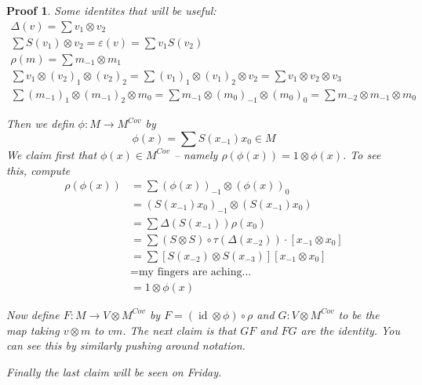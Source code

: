 \documentclass[12pt]{article}
\theoremstyle{break}
\theoremstyle{nonumberbreak}
\theoremstyle{changebreak}
\theoremstyle{break}
\theoremstyle{nonumberbreak}
\newtheorem{prf}{Proof}
\theoremstyle{nonumberplain}
\theoremstyle{change}
\DeclareMathOperator{\id}{id}
\begin{document}
\begin{prf}
	Some identites that will be useful:
	\begin{align*}
		\Delta(v)=\sum v_1\otimes v_2\\
		\sum S(v_1)\otimes v_2=\varepsilon(v)=\sum v_1S(v_2)\\
		\rho(m)=\sum m_{-1}\otimes m_1\\
		\sum v_1\otimes (v_2)_1\otimes (v_2)_2=\sum (v_1)_1\otimes (v_1)_2\otimes v_2=\sum v_1\otimes v_2\otimes v_3\\
		\sum (m_{-1})_1\otimes (m_{-1})_2\otimes m_0=\sum m_{-1}\otimes (m_0)_{-1}\otimes (m_0)_0=\sum m_{-2}\otimes m_{-1}\otimes m_0
	\end{align*}

	Then we defin $\phi:M\to M^{Cov}$ by 
	\[\phi(x)=\sum S(x_{-1})x_0\in M\]
	We claim first that $\phi(x)\in M^{Cov}$ -- namely $\rho(\phi(x))=1\otimes\phi(x)$. To see this, compute
	\begin{align*}
		\rho(\phi(x)) &= \sum (\phi(x))_{-1}\otimes (\phi(x))_0\\
		&= (S(x_{-1})x_0)_{-1}\otimes (S(x_{-1})x_0)\\
		&= \sum\Delta(S(x_{-1}))\rho(x_0)\\
		&= \sum (S\otimes S)\circ \tau(\Delta(x_{-2}))\cdot [x_{-1}\otimes x_0]\\
		&=\sum[S(x_{-2})\otimes S(x_{-3})][x_{-1}\otimes x_0]\\
		&= \text{my fingers are aching...}\\
		&= 1\otimes\phi(x)
	\end{align*}

	Now define $F:M\to V\otimes M^{Cov}$ by $F=(\id\otimes\phi)\circ\rho$ and $G:V\otimes M^{Cov}$ 
	to be the map taking $v\otimes m$ to $vm$. The next claim is that $GF$ and $FG$ are the identity.
	You can see this by similarly pushing around notation.
	
	Finally the last claim will be seen on Friday.
\end{prf}
\end{document}
